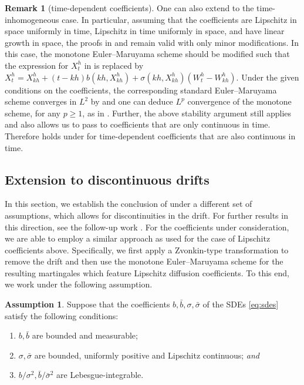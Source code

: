 \documentclass[oneside]{amsart}
\theoremstyle{definition}
\newtheorem{remark}[theorem]{Remark}
\newtheorem{assumption}[theorem]{Assumption}
\numberwithin{equation}{section}
\begin{document}
\begin{remark}[time-dependent coefficients]
	One can also extend  to the time-inhomogeneous case. In particular, assuming that the coefficients are Lipschitz in space uniformly in time, Lipschitz in time uniformly in space, and have linear growth in space, the proofs in  and  remain valid with only minor modifications. In this case, the monotone Euler--Maruyama scheme should be modified such that the expression for $X^h_t$ in  is replaced by $X^h_t = X^h_{kh} + (t - kh)b(kh, X^h_{kh}) + \sigma(kh, X^h_{kh})(W^h_t - W^h_{kh})$. Under the given conditions on the coefficients, the corresponding standard Euler--Maruyama scheme converges in $L^2$ by \cite[Theorem 10.2.2]{KlPl92} and one can deduce $L^p$ convergence of the monotone scheme, for any $p \geq 1$, as in . Further, the above stability argument still applies and also allows us to pass to coefficients that are only continuous in time. Therefore  holds under  for time-dependent coefficients that are also continuous in time.
\end{remark}


\subsection{Extension to discontinuous drifts}\label{sec:discontinuous}

In this section, we establish the conclusion of  under a different set of assumptions, which allows for discontinuities in the drift. For further results in this direction, see the follow-up work \cite{RoSz24}.
For the coefficients under consideration, we are able to employ a similar approach as used for the case of Lipschitz coefficients above.
Specifically, we first apply a Zvonkin-type transformation to remove the drift and then use the monotone Euler--Maruyama scheme for the resulting martingales which feature Lipschitz diffusion coefficients. 
To this end, we work under the following assumption.


\begin{assumption}\label{ass:zvonkin}
	Suppose that the coefficients $b, \bar{b}, \sigma, \bar{\sigma}$ of the SDEs \eqref{eq:sdes} satisfy the following conditions:
	\begin{enumerate}[label=(\roman*)]
		\item $b, \bar{b}$ are bounded and measurable;
		\item $\sigma, \bar{\sigma}$ are bounded, uniformly positive and Lipschitz continuous; \emph{and}
		\item $b/\sigma^2, \bar{b}/\bar{\sigma}^2$ are Lebesgue-integrable.
	\end{enumerate}
\end{assumption}
\end{document}
